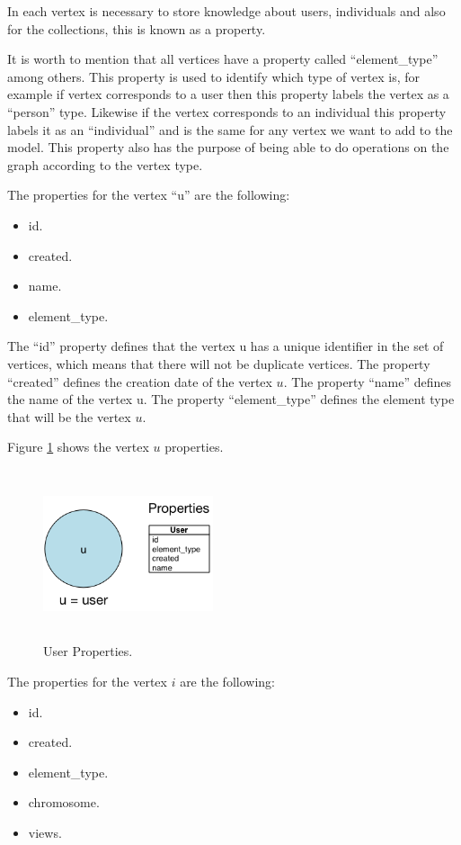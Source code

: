 In each vertex is necessary to store knowledge about users, individuals and
also for the collections, this is known as a property.

It is worth to mention that all vertices have a property called “element\_type”
among others. This property is used to identify which type of vertex is, for
example if vertex corresponds to a user then this property labels the vertex as a
“person” type. Likewise if the vertex corresponds to an individual this property
labels it as an “individual” and is the same for any vertex we want to add to the
model. This property also has the purpose of being able to do operations on the
graph according to the vertex type.

The properties for the vertex “u” are the following:

\begin{itemize}
\item id.
\item created.
\item name.
\item element\_type.
\end{itemize}

The “id” property defines that the vertex u has a unique identifier in the set
of vertices, which means that there will not be duplicate vertices. The property
“created” defines the creation date of the vertex $u$. The property “name”
defines the name of the vertex u. The property “element\_type” defines the
element type that will be the vertex $u$.

Figure \ref{fig:User_node} shows the vertex $u$ properties.

\begin{figure}
\captionsetup{justification=centering,margin=2cm}
\centering
\setlength\fboxsep{0pt}
\setlength\fboxrule{0.7pt}
\includegraphics[width=5cm,height=5cm,keepaspectratio]{img/user_node.png}
\caption{User Properties.}
\label{fig:User_node}
\end{figure}

The properties for the vertex $i$ are the following:
\begin{itemize}
\item id.
\item created.
\item element\_type.
\item chromosome.
\item views.
\end{itemize}

